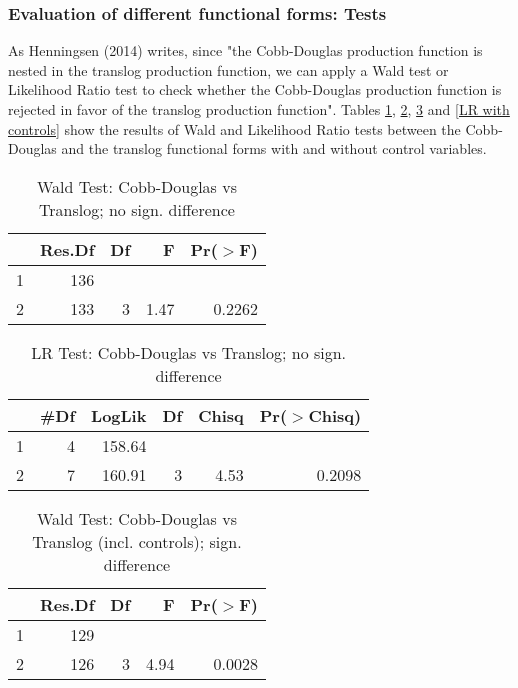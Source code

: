 \documentclass[12pt,a4paper]{article}\usepackage[]{graphicx}\usepackage[]{color}
\begin{document}
\subsubsection{Evaluation of different functional forms: Tests}
As Henningsen (2014) writes, since "the Cobb-Douglas production function is nested in the translog production function, we can apply a Wald test or Likelihood Ratio test to check whether the Cobb-Douglas production function is rejected in favor of the translog production function". Tables \ref{WT}, \ref{LR}, \ref{WT with controls} and \ref{LR with controls} show the results of Wald and Likelihood Ratio tests between the Cobb-Douglas and the translog functional forms with and without control variables. 

\begin{table}[ht]
\centering
\caption{Wald Test: Cobb-Douglas vs Translog; no sign. difference} 
\label{WT}
\begin{tabular}{lrrrr}
  \hline
 & Res.Df & Df & F & Pr($>$F) \\ 
  \hline
1 & 136 &  &  &  \\ 
  2 & 133 & 3 & 1.47 & 0.2262 \\ 
   \hline
\end{tabular}
\end{table}
\begin{table}[ht]
\centering
\caption{LR Test: Cobb-Douglas vs Translog; no sign. difference} 
\label{LR}
\begin{tabular}{lrrrrr}
  \hline
 & \#Df & LogLik & Df & Chisq & Pr($>$Chisq) \\ 
  \hline
1 & 4 & 158.64 &  &  &  \\ 
  2 & 7 & 160.91 & 3 & 4.53 & 0.2098 \\ 
   \hline
\end{tabular}
\end{table}
\begin{table}[ht]
\centering
\caption{Wald Test: Cobb-Douglas vs Translog (incl. controls); sign. difference} 
\label{WT with controls}
\begin{tabular}{lrrrr}
  \hline
 & Res.Df & Df & F & Pr($>$F) \\ 
  \hline
1 & 129 &  &  &  \\ 
  2 & 126 & 3 & 4.94 & 0.0028 \\ 
   \hline
\end{tabular}
\end{table}
\end{document}
